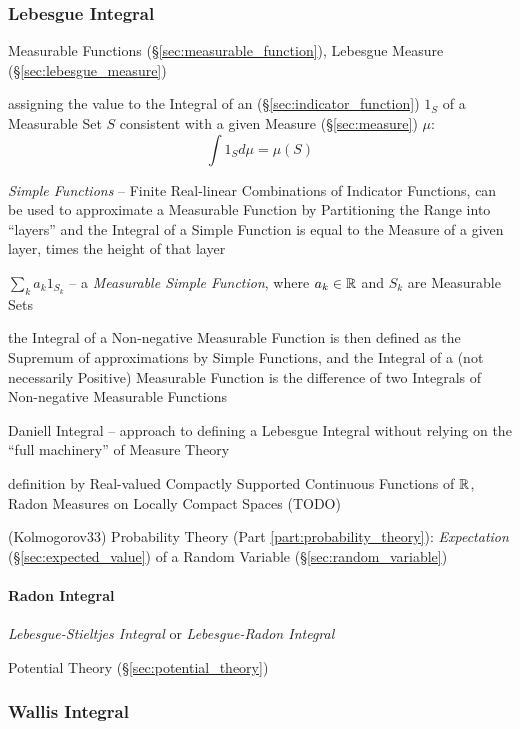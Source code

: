 \subsubsection{Lebesgue Integral}\label{sec:lebesgue_integral}

Measurable Functions (\S\ref{sec:measurable_function}),
Lebesgue Measure (\S\ref{sec:lebesgue_measure})

assigning the value to the Integral of an (\S\ref{sec:indicator_function}) $1_S$
of a Measurable Set $S$ consistent with a given Measure (\S\ref{sec:measure})
$\mu$:
\[
  \int 1_S d\mu = \mu(S)
\]

\emph{Simple Functions} -- Finite Real-linear Combinations of Indicator
Functions, can be used to approximate a Measurable Function by Partitioning the
Range into ``layers'' and the Integral of a Simple Function is equal to the
Measure of a given layer, times the height of that layer

$\sum_k a_k 1_{S_k}$ -- a \emph{Measurable Simple Function}, where
$a_k \in \mathbb{R}$ and $S_k$ are Measurable Sets

the Integral of a Non-negative Measurable Function is then defined as the
Supremum of approximations by Simple Functions, and the Integral of a (not
necessarily Positive) Measurable Function is the difference of two Integrals of
Non-negative Measurable Functions

Daniell Integral -- approach to defining a Lebesgue Integral without relying on
the ``full machinery'' of Measure Theory

definition by Real-valued Compactly Supported Continuous Functions of $\mathbb{R}$,
Radon Measures on Locally Compact Spaces
(TODO)

(Kolmogorov33) Probability Theory (Part \ref{part:probability_theory}):
\emph{Expectation} (\S\ref{sec:expected_value}) of a Random Variable
(\S\ref{sec:random_variable})



\paragraph{Radon Integral}\label{sec:radon_integral}\hfill

\emph{Lebesgue-Stieltjes Integral} or \emph{Lebesgue-Radon Integral}

Potential Theory (\S\ref{sec:potential_theory})



\subsubsection{Wallis Integral}\label{sec:wallis_integral}

